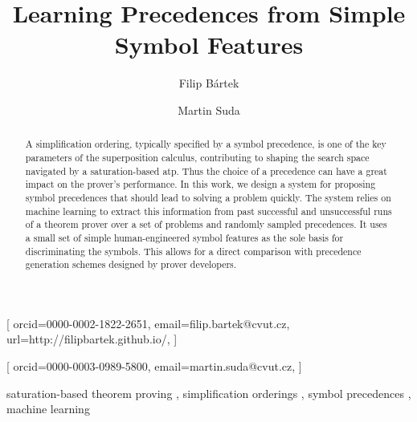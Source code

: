 \documentclass{ceurart}
\begin{document}


\title{Learning Precedences from Simple Symbol Features}

\address[1]{Czech Technical University in Prague, Jugoslávských partyzánů 1580/3, 160 00 Praha 6 - Dejvice, Czech Republic}

\author[1]{Filip Bártek}[
orcid=0000-0002-1822-2651,
email=filip.bartek@cvut.cz,
url=http://filipbartek.github.io/,
]

\author[1]{Martin Suda}[
orcid=0000-0003-0989-5800,
email=martin.suda@cvut.cz,
]

\begin{abstract}
A simplification ordering, typically specified by a symbol precedence,
is one of the key parameters of the superposition calculus, contributing
to shaping the search space navigated by a saturation-based \acrlong*{atp}.
Thus the choice of a precedence can have a great impact on the prover's performance.
In this work, we design a system for proposing symbol precedences
that should lead to solving a problem quickly.
The system relies on machine learning to extract this information from
past successful and unsuccessful runs of a theorem prover over a set of problems and randomly sampled precedences.
It uses a small set of simple human-engineered symbol features as the sole
basis for discriminating the symbols. This allows for a direct comparison
with precedence generation schemes designed by prover developers.
\end{abstract}

\begin{keywords}
  saturation-based theorem proving \sep
  simplification orderings \sep
  symbol precedences \sep
  machine learning
\end{keywords}

\maketitle
\end{document}
